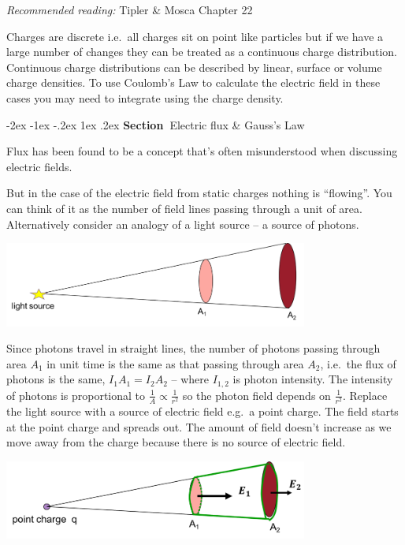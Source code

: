 \documentclass[
]{book}
\makeatletter
\renewcommand\section{%
\@startsection{section}{1}{\z@}%
              {-2ex \@plus -1ex \@minus -.2ex}%
              {1ex \@plus .2ex}%
              {\sffamily\bfseries\large\noindent Section~}}
\makeatother
\begin{document}
\emph{Recommended reading:} Tipler \& Mosca Chapter 22

Charges are discrete i.e.~all charges sit on point like particles but if
we have a large number of changes they can be treated as a continuous
charge distribution. Continuous charge distributions can be described by
linear, surface or volume charge densities. To use Coulomb's Law to
calculate the electric field in these cases you may need to integrate
using the charge density.

\hypertarget{electric-flux-gausss-law}{%
\section{Electric flux \& Gauss's Law}\label{electric-flux-gausss-law}}

Flux has been found to be a concept that's often misunderstood when
discussing electric fields.

But in the case of the electric field from static charges nothing is
``flowing''. You can think of it as the number of field lines passing
through a unit of area. Alternatively consider an analogy of a light
source -- a source of photons.

\includegraphics[width=100mm,height=\textheight]{Figures/lightFlux.png} \protect\hypertarget{fig:lightFlux}{}{}

Since photons travel in straight lines, the number of photons passing
through area \(A_1\) in unit time is the same as that passing through area
\(A_2\), i.e.~the flux of photons is the same, \(I_1 A_1 = I_2 A_2\) --
where \(I_{1,2}\) is photon intensity. The intensity of photons is
proportional to \(\frac{1}{A} \propto \frac{1}{r^2}\) so the photon field
depends on \(\frac{1}{r^2}\). Replace the light source with a source of
electric field e.g.~a point charge. The field starts at the point charge
and spreads out. The amount of field doesn't increase as we move away
from the charge because there is no source of electric field.

\includegraphics[width=100mm,height=\textheight]{Figures/elecFlux1.png} \protect\hypertarget{fig:elecFlux1}{}{}
\end{document}

